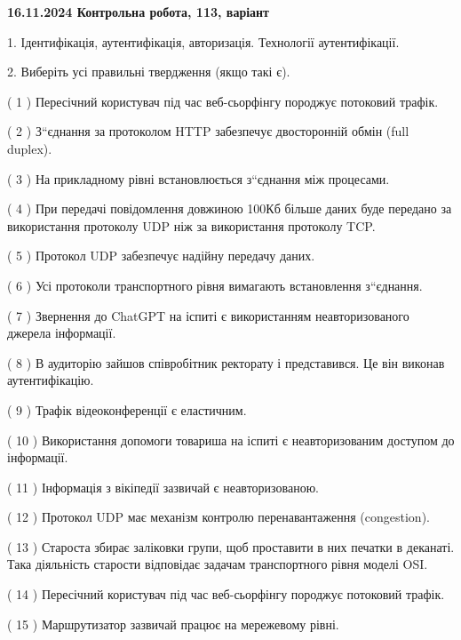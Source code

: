 \documentclass[12pt, ukrainian]{article}
\begin{document}
\vspace{4mm}
\newpage
\begin {large}

\textbf{16.11.2024 Контрольна робота, 113, варіант  }\par


{
1. Ідентифікація, аутентифікація, авторизація. Технології аутентифікації.



\vspace{5mm}
2. Виберіть усі правильні твердження (якщо такі є).\par
\vspace{2mm}

( 1 ) Пересічний користувач під час веб-сьорфінгу породжує потоковий трафік.

( 2 ) З“єднання за протоколом  HTTP забезпечує двосторонній обмін (full duplex).

( 3 ) На прикладному рівні встановлюється з“єднання між процесами.

( 4 ) При передачі повідомлення довжиною 100Кб більше даних буде передано за використання протоколу UDP ніж за використання протоколу TCP.

( 5 ) Протокол UDP забезпечує надійну передачу даних.

( 6 ) Усі протоколи транспортного рівня вимагають встановлення з“єднання.

( 7 ) Звернення до ChatGPT на іспиті є використанням неавторизованого джерела інформації.

( 8 ) В аудиторію зайшов співробітник ректорату і представився. Це він виконав аутентифікацію.

( 9 ) Трафік відеоконференції є еластичним.

( 10 ) Використання допомоги товариша на іспиті є неавторизованим доступом до інформації.

( 11 ) Інформація з вікіпедії зазвичай є неавторизованою.

( 12 ) Протокол UDP має механізм контролю перенавантаження (congestion).

( 13 ) Староста збирає заліковки групи, щоб проставити в них печатки в деканаті. Така діяльність старости відповідає задачам транспортного рівня моделі OSI.

( 14 ) Пересічний користувач під час веб-сьорфінгу породжує потоковий трафік.

( 15 ) Маршрутизатор зазвичай працює на мережевому рівні.
}
\end {large}
\end{document}
